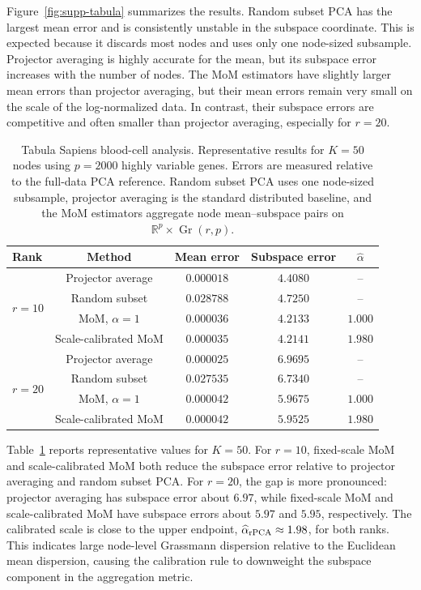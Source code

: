 \documentclass[11pt]{article}
\newcommand{\R}{\mathbb R}
\newcommand{\Gr}{\operatorname{Gr}}
\begin{document}
Figure~\ref{fig:supp-tabula} summarizes the results.  Random subset PCA has the largest mean error and is consistently unstable in the subspace coordinate.  This is expected because it discards most nodes and uses only one node-sized subsample.  Projector averaging is highly accurate for the mean, but its subspace error increases with the number of nodes.  The MoM estimators have slightly larger mean errors than projector averaging, but their mean errors remain very small on the scale of the log-normalized data.  In contrast, their subspace errors are competitive and often smaller than projector averaging, especially for \(r=20\).

\begin{table}[ht!]
\centering
\caption{
{Tabula Sapiens blood-cell analysis.}
Representative results for \(K=50\) nodes using \(p=2000\) highly variable genes.  Errors are measured relative to the full-data PCA reference.  Random subset PCA uses one node-sized subsample, projector averaging is the standard distributed baseline, and the MoM estimators aggregate node mean--subspace pairs on \(\R^p\times\Gr(r,p)\).
}
\label{tab:supp-tabula}
\begin{tabular}{lcccc}
\toprule
Rank & Method & Mean error & Subspace error & \(\widehat\alpha\) \\
\midrule
\multirow{4}{*}{\(r=10\)}
& Projector average & \(0.000018\) & \(4.4080\) & -- \\
& Random subset & \(0.028788\) & \(4.7250\) & -- \\
& MoM, \(\alpha=1\) & \(0.000036\) & \(4.2133\) & \(1.000\) \\
& Scale-calibrated MoM & \(0.000035\) & \(4.2141\) & \(1.980\) \\
\midrule
\multirow{4}{*}{\(r=20\)}
& Projector average & \(0.000025\) & \(6.9695\) & -- \\
& Random subset & \(0.027535\) & \(6.7340\) & -- \\
& MoM, \(\alpha=1\) & \(0.000042\) & \(5.9675\) & \(1.000\) \\
& Scale-calibrated MoM & \(0.000042\) & \(5.9525\) & \(1.980\) \\
\bottomrule
\end{tabular}
\end{table}

Table~\ref{tab:supp-tabula} reports representative values for \(K=50\).  For \(r=10\), fixed-scale MoM and scale-calibrated MoM both reduce the subspace error relative to projector averaging and random subset PCA.  For \(r=20\), the gap is more pronounced: projector averaging has subspace error about \(6.97\), while fixed-scale MoM and scale-calibrated MoM have subspace errors about \(5.97\) and \(5.95\), respectively.  The calibrated scale is close to the upper endpoint, \(\widehat\alpha_{\rm rPCA}\approx1.98\), for both ranks.  This indicates large node-level Grassmann dispersion relative to the Euclidean mean dispersion, causing the calibration rule to downweight the subspace component in the aggregation metric.
\end{document}
